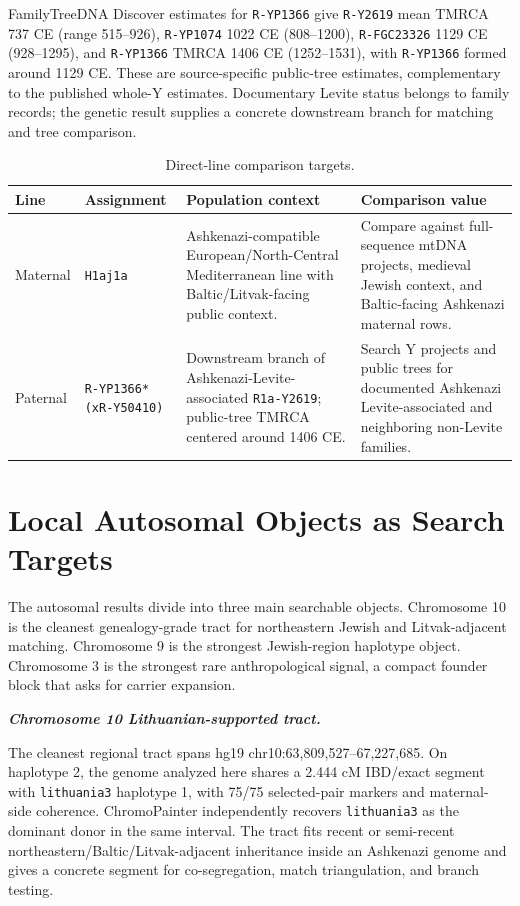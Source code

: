\documentclass[11pt]{article}
\newcommand{\objectheading}[1]{%
  \par\addvspace{0.9\baselineskip}%
  \noindent\textbf{\textit{#1}}\par\nopagebreak\smallskip\noindent%
}
\begin{document}
FamilyTreeDNA Discover estimates for \texttt{R-YP1366} give \texttt{R-Y2619} mean TMRCA 737 CE (range 515--926), \texttt{R-YP1074} 1022 CE (808--1200), \texttt{R-FGC23326} 1129 CE (928--1295), and \texttt{R-YP1366} TMRCA 1406 CE (1252--1531), with \texttt{R-YP1366} formed around 1129 CE. These are source-specific public-tree estimates, complementary to the published whole-Y estimates. Documentary Levite status belongs to family records; the genetic result supplies a concrete downstream branch for matching and tree comparison.

\begin{table}[htbp]
\centering
\caption{Direct-line comparison targets.}
\small
\begin{tabularx}{\textwidth}{p{}p{}Y Y}
\toprule
Line & Assignment & Population context & Comparison value \\
\midrule
Maternal & \texttt{H1aj1a} & Ashkenazi-compatible European/North-Central Mediterranean line with Baltic/Litvak-facing public context. & Compare against full-sequence mtDNA projects, medieval Jewish context, and Baltic-facing Ashkenazi maternal rows. \\
Paternal & \texttt{R-YP1366*(xR-Y50410)} & Downstream branch of Ashkenazi-Levite-associated \texttt{R1a-Y2619}; public-tree TMRCA centered around 1406 CE. & Search Y projects and public trees for documented Ashkenazi Levite-associated and neighboring non-Levite families. \\
\bottomrule
\end{tabularx}
\end{table}

\section{Local Autosomal Objects as Search Targets}

The autosomal results divide into three main searchable objects. Chromosome 10 is the cleanest genealogy-grade tract for northeastern Jewish and Litvak-adjacent matching. Chromosome 9 is the strongest Jewish-region haplotype object. Chromosome 3 is the strongest rare anthropological signal, a compact founder block that asks for carrier expansion.

\objectheading{Chromosome 10 Lithuanian-supported tract.}
The cleanest regional tract spans hg19 chr10:63,809,527--67,227,685. On haplotype 2, the genome analyzed here shares a 2.444 cM IBD/exact segment with \texttt{lithuania3} haplotype 1, with 75/75 selected-pair markers and maternal-side coherence. ChromoPainter independently recovers \texttt{lithuania3} as the dominant donor in the same interval. The tract fits recent or semi-recent northeastern/Baltic/Litvak-adjacent inheritance inside an Ashkenazi genome and gives a concrete segment for co-segregation, match triangulation, and branch testing.
\end{document}
